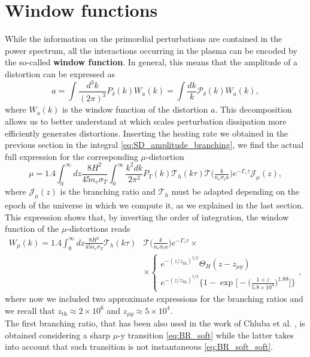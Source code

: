 \section{Window functions}
While the information on the primordial perturbations are contained in the power spectrum, all the interactions occurring in the plasma can be encoded by the so-called \textbf{window function}. In general, this means that the amplitude of a distortion can be expressed as
\begin{equation}\label{eq:window_function}
    a=\int\frac{d^3k}{(2\pi)^3} P_\delta(k) W_a(k)=\int\frac{dk}{k} \mathcal P_\delta(k) W_a(k) ,
\end{equation}
where $W_a(k)$ is the window function of the distortion $a$. This decomposition allows us to better understand at which scales perturbation dissipation more efficiently generates distortions. Inserting the heating rate we obtained in the previous section in the integral \eqref{eq:SD_amplitude_branching}, we find the actual full expression for the corresponding $\mu$-distortion
$$\mu=1.4\int_{0}^\infty dz\frac{8H^2}{45 n_e\sigma_T}\int_0^\infty\frac{k^2dk}{2\pi^2} P_T(k)\mathcal T_h(k\tau)\mathcal T\Big(\tfrac{k}{n_e\sigma_ta}\Big)e^{-\Gamma_\gamma\tau}\mathcal{J}_\mu(z),$$
where $\mathcal{J}_\mu(z)$ is the branching ratio and $\mathcal T_h$ must be adapted depending on the epoch of the universe in which we compute it, as we explained in the last section.
This expression shows that, by inverting the order of integration, the window function of the $\mu$-distortions reads
\begin{align*}
    W_\mu(k)=1.4\int_{0}^\infty dz\frac{8H^2}{45 n_e\sigma_T}\mathcal T_h(k\tau)&\mathcal T\Big(\tfrac{k}{n_e\sigma_ta}\Big)e^{-\Gamma_\gamma\tau}\times\\&\times
    \begin{cases}
        e^{-(z/z_{\text{th}})^{5/2}}\Theta_H(z-z_{\mu y})\\
        e^{-(z/z_{\text{th}})^{5/2}}\Bigg\{1-\exp\bigg[-\big(\frac{1+z}{5.8\times10^4}\big)^{1.88}\bigg]\Bigg\}
    \end{cases},
\end{align*}
where now we included two approximate expressions for the branching ratios and we recall that $z_\text{th}\approx 2\times 10^6$ and $z_{\mu y}\approx 5\times 10^4$.\\
The first branching ratio, that has been also used in the work of Chluba et al. \cite{Chluba_tens_diss}, is obtained considering a sharp $\mu$-y transition \eqref{eq:BR_soft} while the latter takes into account that such transition is not instantaneous \eqref{eq:BR_soft_soft}.
